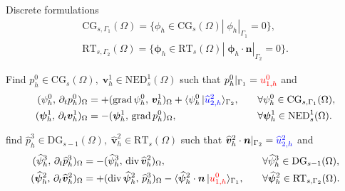 \documentclass[aspectratio=169]{beamer}
\DeclareMathOperator*{\grad}{grad}
\renewcommand{\div}{\operatorname{div}}
\newcommand{\inpr}[3][]{\ensuremath{( #2, \, #3 )_{#1}}}
\newcommand{\dualpr}[3][]{\ensuremath{\langle #2 \, \vert #3 \rangle_{#1}}}
\newcommand*{\dual}[1]{\ensuremath{\widehat{#1}}}
\begin{document}
	
	\begin{frame}{Discrete formulations}
		\begin{equation*}
			\begin{aligned}
				\mathrm{CG}_{s, \Gamma_1}(\Omega) = \{\phi_h \in \mathrm{CG}_{s}(\Omega) |\; \phi_h|_{\Gamma_1} = 0\}, \\
				\mathrm{RT}_{s, \Gamma_2}(\Omega) = \{\bm{\phi}_h \in \mathrm{RT}_{s}(\Omega) |\; \bm{\phi}_h \cdot \bm{n}|_{\Gamma_2} = 0\}.
			\end{aligned}
		\end{equation*}
		
		
		
		\begin{tcolorbox}[nobeforeafter, colframe=theme,title=Primal weak formulation]%
			Find $p^0_h \in \mathrm{CG}_{s}(\Omega), \; \bm{v}^1_h \in \mathrm{NED}^1_s(\Omega)$ such that $p^0_h|_{\Gamma_1} = \textcolor{red}{u^0_{1, h}}$ and
			\begin{equation*}
				\begin{aligned}
					\inpr[\Omega]{\psi^0_h}{\partial_t p^0_h} &= +\inpr[\Omega]{\grad \psi^0_h}{\bm{v}^1_h} + \dualpr[\Gamma_2]{\psi^0_h}{\textcolor{blue}{\dual{u}^2_{2, h}}}, \\
					\inpr[\Omega]{\bm{\psi}^1_h}{\partial_t \bm{v}^1_h} &= -\inpr[\Omega]{\bm{\psi}^1_h}{\grad {p}^0_h},
				\end{aligned} \qquad
				\begin{aligned}
					&\forall \psi^0_h \in \mathrm{CG}_{s, \Gamma_1}(\Omega), \\
					&\forall \bm{\psi}^1_h \in \mathrm{NED}^1_{s}(\Omega).
				\end{aligned}
			\end{equation*}	
			
		\end{tcolorbox} 
		
		
		\begin{tcolorbox}[nobeforeafter, colframe=theme,title=Dual weak formulation]%
			find $\dual{p}^3_h \in \mathrm{DG}_{s-1}(\Omega), \; \dual{\bm{v}}^2_h \in \mathrm{RT}_{s}(\Omega)$ such that $\dual{\bm{v}}^2_h \cdot \bm{n}|_{\Gamma_2} = \textcolor{blue}{\dual{u}^2_{2, h}}$ and
			\begin{equation*}
				\begin{aligned}
					\inpr[\Omega]{\dual{\psi}^3_h}{\partial_t \dual{p}^3_h} &= -\inpr[\Omega]{\dual{\psi}^3_h}{\div\dual{\bm{v}}^2_h}, \\
					\inpr[\Omega]{\dual{\bm{\psi}}^2_h}{\partial_t \dual{\bm{v}}^2_h} &= +\inpr[\Omega]{\div \dual{\bm{\psi}}^2_h}{\dual{p}^3_h} - \dualpr[\Gamma_1]{\dual{\bm{\psi}}^2_h \cdot \bm{n}}{\textcolor{red}{u^0_{1, h}}},
				\end{aligned} \qquad
				\begin{aligned}
					&\forall \dual{\psi}^3_h \in \mathrm{DG}_{s-1}(\Omega), \\
					&\forall \dual{\bm{\psi}}^2_h \in \mathrm{RT}_{s, \Gamma_2}(\Omega).
				\end{aligned}
			\end{equation*}
		\end{tcolorbox} 
		
	\end{frame}
	
\end{document}

